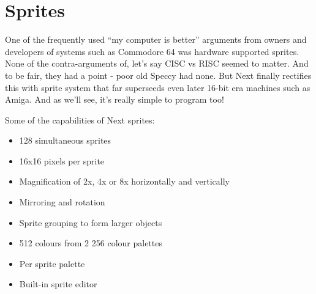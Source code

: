 \documentclass[12pt,twoside,openright,a4paper]{book}
\begin{document}
\pagebreak
\section{Sprites}


One of the frequently used ``my computer is better'' arguments from owners and developers of systems such as Commodore 64 was hardware supported sprites. None of the contra-arguments of, let's say CISC vs RISC seemed to matter. And to be fair, they had a point - poor old Speccy had none. But Next finally rectifies this with sprite system that far superseeds even later 16-bit era machines such as Amiga. And as we'll see, it's really simple to program too!

Some of the capabilities of Next sprites:

\begin{itemize}[topsep=1pt,itemsep=1pt]
	\item 128 simultaneous sprites
	\item 16x16 pixels per sprite
	\item Magnification of 2x, 4x or 8x horizontally and vertically
	\item Mirroring and rotation
	\item Sprite grouping to form larger objects
	\item 512 colours from 2 256 colour palettes
	\item Per sprite palette
	\item Built-in sprite editor
\end{itemize}
\end{document}
